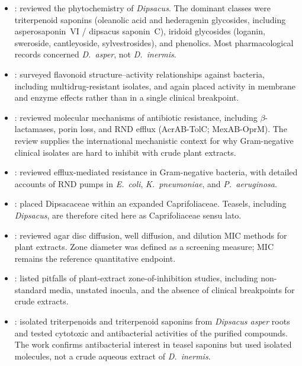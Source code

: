 \begin{itemize}
\item \citet{zhao2011}: reviewed the phytochemistry of \textit{Dipsacus}. The dominant classes were triterpenoid saponins (oleanolic acid and hederagenin glycosides, including asperosaponin~VI / dipsacus saponin~C), iridoid glycosides (loganin, sweroside, cantleyoside, sylvestrosides), and phenolics. Most pharmacological records concerned \textit{D.\ asper}, not \textit{D.\ inermis}.

\item \citet{xie2015}: surveyed flavonoid structure--activity relationships against bacteria, including multidrug-resistant isolates, and again placed activity in membrane and enzyme effects rather than in a single clinical breakpoint.

\item \citet{blair2015}: reviewed molecular mechanisms of antibiotic resistance, including $\beta$-lactamases, porin loss, and RND efflux (AcrAB-TolC; MexAB-OprM). The review supplies the international mechanistic context for why Gram-negative clinical isolates are hard to inhibit with crude plant extracts.

\item \citet{li2015}: reviewed efflux-mediated resistance in Gram-negative bacteria, with detailed accounts of RND pumps in \textit{E.\ coli}, \textit{K.\ pneumoniae}, and \textit{P.\ aeruginosa}.

\item \citet{apgiv2016}: placed Dipsacaceae within an expanded Caprifoliaceae. Teasels, including \textit{Dipsacus}, are therefore cited here as Caprifoliaceae sensu lato.

\item \citet{balouiri2016}: reviewed agar disc diffusion, well diffusion, and dilution MIC methods for plant extracts. Zone diameter was defined as a screening measure; MIC remains the reference quantitative endpoint.

\item \citet{vanvuuren2019}: listed pitfalls of plant-extract zone-of-inhibition studies, including non-standard media, unstated inocula, and the absence of clinical breakpoints for crude extracts.

\item \citet{yu2019}: isolated triterpenoids and triterpenoid saponins from \textit{Dipsacus asper} roots and tested cytotoxic and antibacterial activities of the purified compounds. The work confirms antibacterial interest in teasel saponins but used isolated molecules, not a crude aqueous extract of \textit{D.\ inermis}.


\end{itemize}

